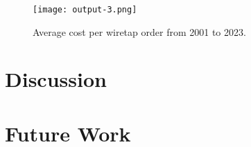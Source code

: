 \documentclass[11pt,twocolumn]{article} %
\begin{document}
\begin{figure}[h!]
\centering
\texttt{[image: output-3.png]}
\caption{Average cost per wiretap order from 2001 to 2023.}
\label{fig:costgraph}
\end{figure}

\section{Discussion}

\section{Future Work}
\end{document}
